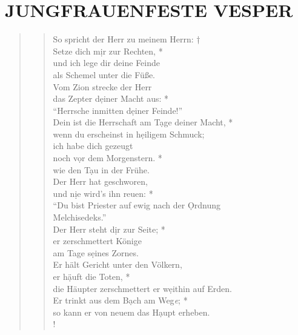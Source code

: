 

\section[]{JUNGFRAUENFESTE VESPER}


\vspace{0.5cm}

\begin{quote}
\begin{verse}

So spricht der Herr zu meinem Herrn: †\\
Setze dich m\d ir zur Rechten, *\\
und ich lege dir deine Feinde\\
als Schemel unter die Füße.\\
\vin Vom Zion strecke der Herr \\
\vin das Zepter d\d einer Macht aus: *\\
\vin ``Herrsche inmitten d\d einer Feinde!''\\
Dein ist die Herrschaft am T\d age deiner Macht, *\\
wenn du erscheinst in h\d eiligem Schmuck;\\
\vin ich habe dich gezeugt\\ 
\vin noch v\d or dem Morgenstern. *\\
\vin wie den T\d au in der Frühe.\\
Der Herr hat geschworen,\\
und n\d ie wird’s ihn reuen: *\\
``Du bist Priester auf ewig nach der \d Ordnung \\
Melchisedeks.''\\
\vin Der Herr steht d\d ir zur Seite; *\\
\vin er zerschmettert Könige\\
\vin am Tage s\d eines Zornes.\\
Er hält Gericht unter den Völkern,\\
er h\d äuft die Toten, *\\
die Häupter zerschmettert er w\d eithin auf Erden.\\
Er trinkt aus dem B\d ach am Weg\textit{e}; *\\
so kann er von neuem das H\d aupt erheben.\\!
\end{verse}
\end{quote}

\newpage


